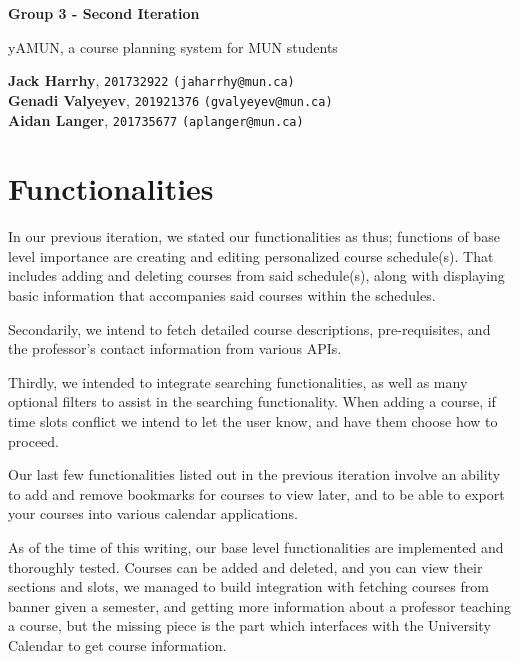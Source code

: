 \documentclass[12pt]{article}
\begin{document}
\begin{titlepage}
    \begin{center}
        \vspace*{1cm}
            
        \Huge
        \textbf{Group 3 - Second Iteration}
            
        \vspace{0.5cm}
        \LARGE
        yAMUN, a course planning system for MUN students
            
        \vspace{1.5cm}
            
        \textbf{Jack Harrhy}, \texttt{201732922} \texttt{(jaharrhy@mun.ca)} \\
        \textbf{Genadi Valyeyev}, \texttt{201921376} \texttt{(gvalyeyev@mun.ca)}\\
        \textbf{Aidan Langer}, \texttt{201735677} \texttt{(aplanger@mun.ca)}\\
            
        \vfill
    \end{center}
\end{titlepage}

\section{Functionalities}

	In our previous iteration, we stated our functionalities as thus; functions of base level importance are creating and editing personalized course schedule(s). That includes adding and deleting courses from said schedule(s), along with displaying basic information that accompanies said courses within the schedules.
	
	Secondarily, we intend to fetch detailed course descriptions, pre-requisites, and the professor’s contact information from various APIs.
	
	Thirdly, we intended to integrate searching functionalities, as well as many optional filters to assist in the searching functionality. When adding a course, if time slots conflict we intend to let the user know, and have them choose how to proceed.
	
	Our last few functionalities listed out in the previous iteration involve an ability to add and remove bookmarks for courses to view later, and to be able to export your courses into various calendar applications.

    As of the time of this writing, our base level functionalities are implemented and thoroughly tested. Courses can be added and deleted, and you can view their sections and slots, we managed to build integration with fetching courses from banner given a semester, and getting more information about a professor teaching a course, but the missing piece is the part which interfaces with the University Calendar to get course information.
    
\end{document}
